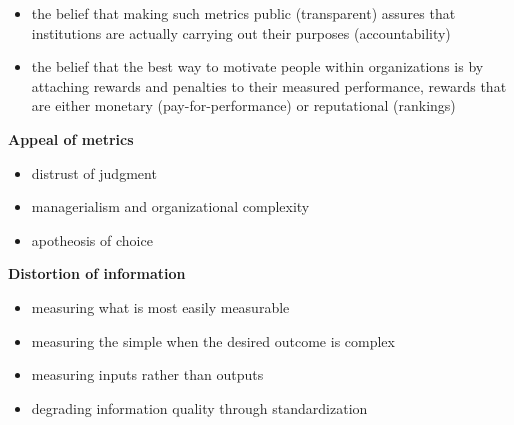 \begin{frame}

\begin{itemize}\setlength\itemsep{1em}
\item the belief that making such metrics public (transparent) assures that institutions are actually carrying out their purposes (accountability)
\item the belief that the best way to motivate people within organizations is by attaching rewards and penalties to their measured performance, rewards that are either monetary (pay-for-performance) or reputational (rankings)

\end{itemize}
\end{frame}
\begin{frame}\textbf{Appeal of metrics}\\\vspace{0.3cm}

\begin{itemize}\setlength\itemsep{1em}
\item distrust of judgment
\item managerialism and organizational complexity
\item apotheosis of choice
\end{itemize}
\end{frame}
\begin{frame}
\textbf{Distortion of information}\\\vspace{0.3cm}
\begin{itemize}\setlength\itemsep{1em}
\item measuring what is most easily measurable
\item measuring the simple when the desired outcome is complex
\item measuring inputs rather than outputs
\item degrading information quality through standardization
\end{itemize}
\end{frame}
